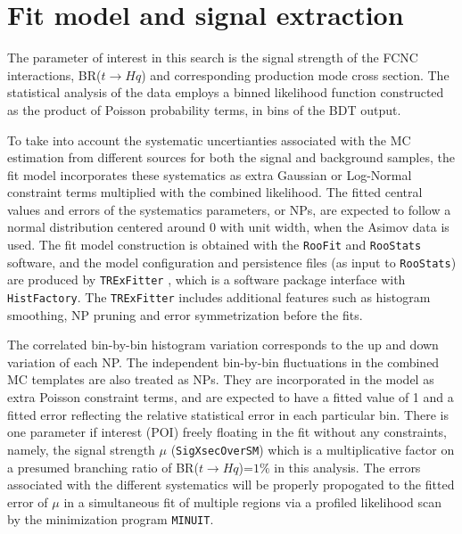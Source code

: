 \section{Fit model and signal extraction}
\label{sec:fit}

The parameter of interest in this search is the signal strength of the FCNC interactions, BR($t\to Hq$) and corresponding production mode cross section. The statistical analysis of the data employs a binned likelihood function constructed as the product of Poisson probability terms, in bins of the BDT output.

To take into account the systematic uncertianties associated with the MC estimation from different sources for both the signal and background samples, the fit model incorporates these systematics as extra Gaussian or Log-Normal constraint terms multiplied with the combined likelihood. The fitted central values and errors of the systematics parameters, or NPs, are expected to follow a normal distribution centered around 0 with unit width, when the Asimov data is used. The fit model construction is obtained with the \texttt{RooFit} and \texttt{RooStats} software, and the model configuration and persistence files (as input to \texttt{RooStats}) are produced by \texttt{TRExFitter} \cite{TRExFitter}, which is a software package interface with \texttt{HistFactory}. The \texttt{TRExFitter} includes additional features such as histogram smoothing, NP pruning and error symmetrization before the fits.

The correlated bin-by-bin histogram variation corresponds to the up and down variation of each NP. The independent bin-by-bin fluctuations in the combined MC templates are also treated as NPs. They are incorporated in the model as extra Poisson constraint terms, and are expected to have a fitted value of 1 and a fitted error reflecting the relative statistical error in each particular bin. There is one parameter if interest (POI) freely floating in the fit without any constraints, namely, the signal strength $\mu$ (\texttt{SigXsecOverSM}) which is a multiplicative factor on a presumed branching ratio of BR($t\to Hq$)=$1\%$ in this analysis. The errors associated with the different systematics will be properly propogated to the fitted error of $\mu$ in a simultaneous fit of multiple regions via a profiled likelihood scan by the minimization program \texttt{MINUIT}. 

